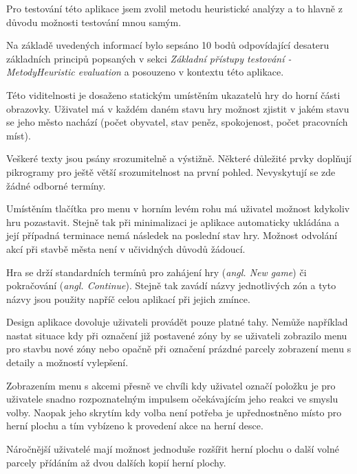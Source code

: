 \documentclass[twoside,12pt]{article}
\begin{document}
Pro testování této aplikace jsem zvolil metodu heuristické analýzy a to hlavně z důvodu možnosti testování mnou samým.

Na základě uvedených informací bylo sepsáno 10 bodů odpovídající desateru základních principů popsaných v sekci \textit{Základní přístupy testování - MetodyHeuristic evaluation} a posouzeno v kontextu této aplikace.

Této viditelnosti je dosaženo statickým umístěním ukazatelů hry do horní části obrazovky. Uživatel má v každém daném stavu hry možnost zjistit v jakém stavu se jeho město nachází (počet obyvatel, stav peněz, spokojenost, počet pracovních míst).

Veškeré texty jsou psány srozumitelně a výstižně. Některé důležité prvky doplňují pikrogramy pro ještě větší srozumitelnost na první pohled. Nevyskytují se zde žádné odborné termíny.

Umístěním tlačítka pro menu v horním levém rohu má uživatel možnost kdykoliv hru pozastavit. Stejně tak při minimalizaci je aplikace automaticky ukládána a její případná terminace nemá následek na poslední stav hry. Možnost odvolání akcí při stavbě města není v učividných důvodů žádoucí.

Hra se drží standardních termínů pro zahájení hry (\textit{angl. New game}) či pokračování (\textit{angl. Continue}). Stejně tak zavádí názvy jednotlivých zón a tyto názvy jsou použity napříč celou aplikací při jejich zmínce.

Design aplikace dovoluje uživateli provádět pouze platné tahy. Nemůže například nastat situace kdy při označení již postavené zóny by se uživateli zobrazilo menu pro stavbu nové zóny nebo opačně při označení prázdné parcely zobrazení menu s detaily a možností vylepšení. 

Zobrazením menu s akcemi přesně ve chvíli kdy uživatel označí položku je pro uživatele snadno rozpoznatelným impulsem očekávajícím jeho reakci ve smyslu volby. Naopak jeho skrytím kdy volba není potřeba je upřednostněno místo pro herní plochu a tím vybízeno k provedení akce na herní desce.

Náročnější uživatelé mají možnost jednoduše rozšířit herní plochu o další volné parcely přídáním až dvou dalších kopií herní plochy.
\end{document}

